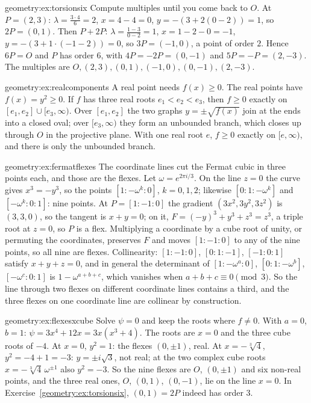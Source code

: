 \begin{solution}{geometry:ex:torsionsix}
\idea Compute multiples until you come back to $O$.
\writeup At $P=(2,3)$: $\lambda=\frac{3\cdot4}{6}=2$, $x=4-4=0$, $y=-(3+2(0-2))=1$, so $2P=(0,1)$. Then $P+2P$: $\lambda=\frac{1-3}{0-2}=1$, $x=1-2-0=-1$,
$y=-(3+1\cdot(-1-2))=0$, so $3P=(-1,0)$, a point of order $2$. Hence $6P=O$ and $P$ has order $6$, with $4P=-2P=(0,-1)$ and $5P=-P=(2,-3)$. The multiples are
$O,(2,3),(0,1),(-1,0),(0,-1),(2,-3)$.
\end{solution}

\begin{solution}{geometry:ex:realcomponents}
\idea A real point needs $f(x)\ge0$.
\writeup The real points have $f(x)=y^2\ge0$. If $f$ has three real roots $e_1<e_2<e_3$, then $f\ge0$ exactly on $[e_1,e_2]\cup[e_3,\infty)$. Over $[e_1,e_2]$ the
two graphs $y=\pm\sqrt{f(x)}$ join at the ends into a closed oval; over $[e_3,\infty)$ they form an unbounded branch, which closes up through $O$ in the
projective plane. With one real root $e$, $f\ge0$ exactly on $[e,\infty)$, and there is only the unbounded branch.
\end{solution}

\begin{solution}{geometry:ex:fermatflexes}
\idea The coordinate lines cut the Fermat cubic in three points each, and those are the flexes.
\writeup Let $\omega=e^{2\pi i/3}$. On the line $z=0$ the curve gives $x^3=-y^3$, so the points $[1:-\omega^k:0]$, $k=0,1,2$; likewise $[0:1:-\omega^k]$ and
$[-\omega^k:0:1]$: nine points. At $P=[1:-1:0]$ the gradient $(3x^2,3y^2,3z^2)$ is $(3,3,0)$, so the tangent is $x+y=0$; on it, $F=(-y)^3+y^3+z^3=z^3$, a triple root
at $z=0$, so $P$ is a flex. Multiplying a coordinate by a cube root of unity, or permuting the coordinates, preserves $F$ and moves $[1:-1:0]$ to any of the nine points, so all nine
are flexes. Collinearity:
$[1:-1:0]$, $[0:1:-1]$, $[-1:0:1]$ satisfy $x+y+z=0$, and in general the determinant of $[1:-\omega^a:0]$, $[0:1:-\omega^b]$, $[-\omega^c:0:1]$ is
$1-\omega^{a+b+c}$, which vanishes when $a+b+c\equiv0\pmod3$. So the line through two flexes on different coordinate lines contains a third, and the three
flexes on one coordinate line are collinear by construction.
\end{solution}

\begin{solution}{geometry:ex:flexesxcube}
\idea Solve $\psi=0$ and keep the roots where $f\ne0$.
\writeup With $a=0$, $b=1$: $\psi=3x^4+12x=3x(x^3+4)$. The roots are $x=0$ and the three cube roots of $-4$. At $x=0$, $y^2=1$: the flexes $(0,\pm1)$, real. At
$x=-\sqrt[3]4$, $y^2=-4+1=-3$: $y=\pm i\sqrt3$, not real; at the two complex cube roots $x=-\sqrt[3]4\,\omega^{\pm1}$ also $y^2=-3$. So the nine flexes are $O$, $(0,\pm1)$
and six non-real points, and the three real ones, $O$, $(0,1)$, $(0,-1)$, lie on the line $x=0$. In Exercise~\ref{geometry:ex:torsionsix}, $(0,1)=2P$ indeed has order $3$.
\end{solution}

